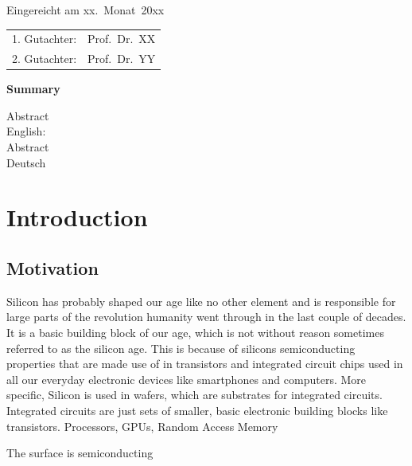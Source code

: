 	
	\thispagestyle{empty}\vspace*{48em}
	
	Eingereicht am xx.~Monat~20xx\vspace{1.5em}
	\par{\large\begin{tabular}{ll}
			1. Gutachter: & Prof.~Dr.~XX \\
			2. Gutachter: & Prof.~Dr.~YY \\
	\end{tabular}}
	
	
	\newpage
	\begin{center}\large\bfseries Summary\end{center}
	
	
	Abstract \\
	English: \\
	
	\vspace{20em}
	Abstract \\
	Deutsch \\
	
	
	
	\tableofcontents
	
	
	
	\frontmatter
	\chapter{Introduction}
	\section{Motivation}
	Silicon has probably shaped our age like no other element and is responsible for large parts of the revolution humanity went through in the last couple of decades. It is a basic building block of our age, which is not without reason sometimes referred to as the silicon age. This is because of silicons semiconducting properties that are made use of in transistors and integrated circuit chips used in all our everyday electronic devices like smartphones and computers. More specific, Silicon is used in wafers, which are substrates for integrated circuits. Integrated circuits are just sets of smaller, basic electronic building blocks like transistors. Processors, GPUs, Random Access Memory
	
	The surface is semiconducting \cite{himpsel1979photoemission, uhrberg1981experimental, handa1989plasma}
	
